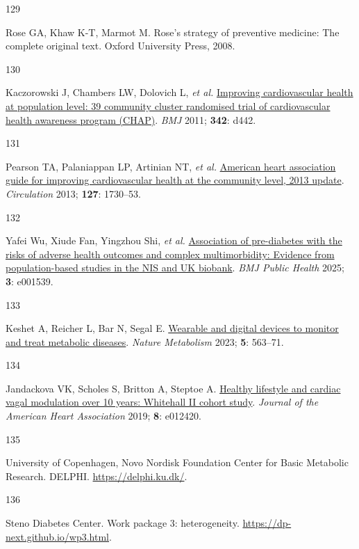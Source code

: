 \documentclass[
  a4paper,
  headsepline=true,
  open=left]{scrbook}
\newlength{\cslhangindent}
\newlength{\csllabelwidth}
\newlength{\cslentryspacingunit} %
\newenvironment{CSLReferences}[2] %
 {%
  \setlength{\parindent}{0pt}
  \ifodd #1
  \let\oldpar\par
  \def\par{\hangindent=\cslhangindent\oldpar}
  \fi
  \setlength{\parskip}{#2\cslentryspacingunit}
 }%
 {}
\newcommand{\CSLLeftMargin}[1]{\parbox[t]{\csllabelwidth}{#1}}
\newcommand{\CSLRightInline}[1]{\parbox[t]{\linewidth - \csllabelwidth}{#1}\break}
\begin{document}
\begin{CSLReferences}{0}{0}
\leavevmode{}%
\CSLLeftMargin{129 }%
\CSLRightInline{Rose GA, Khaw K-T, Marmot M. Rose's strategy of
preventive medicine: The complete original text. Oxford University
Press, 2008.}

\leavevmode{}%
\CSLLeftMargin{130 }%
\CSLRightInline{Kaczorowski J, Chambers LW, Dolovich L, \emph{et al.}
\href{https://doi.org/10.1136/bmj.d442}{Improving cardiovascular health
at population level: 39 community cluster randomised trial of
cardiovascular health awareness program (CHAP)}. \emph{BMJ} 2011;
\textbf{342}: d442.}

\leavevmode{}%
\CSLLeftMargin{131 }%
\CSLRightInline{Pearson TA, Palaniappan LP, Artinian NT, \emph{et al.}
\href{https://doi.org/10.1161/CIR.0b013e31828f8a94}{American heart
association guide for improving cardiovascular health at the community
level, 2013 update}. \emph{Circulation} 2013; \textbf{127}: 1730--53.}

\leavevmode{}%
\CSLLeftMargin{132 }%
\CSLRightInline{Yafei Wu, Xiude Fan, Yingzhou Shi, \emph{et al.}
\href{https://doi.org/10.1136/bmjph-2024-001539}{Association of
pre-diabetes with the risks of adverse health outcomes and complex
multimorbidity: Evidence from population-based studies in the NIS and UK
biobank}. \emph{BMJ Public Health} 2025; \textbf{3}: e001539.}

\leavevmode{}%
\CSLLeftMargin{133 }%
\CSLRightInline{Keshet A, Reicher L, Bar N, Segal E.
\href{https://doi.org/10.1038/s42255-023-00778-y}{Wearable and digital
devices to monitor and treat metabolic diseases}. \emph{Nature
Metabolism} 2023; \textbf{5}: 563--71.}

\leavevmode{}%
\CSLLeftMargin{134 }%
\CSLRightInline{Jandackova VK, Scholes S, Britton A, Steptoe A.
\href{https://doi.org/10.1161/JAHA.119.012420}{Healthy lifestyle and
cardiac vagal modulation over 10 years: Whitehall II cohort study}.
\emph{Journal of the American Heart Association} 2019; \textbf{8}:
e012420.}

\leavevmode{}%
\CSLLeftMargin{135 }%
\CSLRightInline{University of Copenhagen, Novo Nordisk Foundation Center
for Basic Metabolic Research. DELPHI. \url{https://delphi.ku.dk/}.}

\leavevmode{}%
\CSLLeftMargin{136 }%
\CSLRightInline{Steno Diabetes Center. Work package 3: heterogeneity.
\url{https://dp-next.github.io/wp3.html}.}


\end{CSLReferences}
\end{document}
